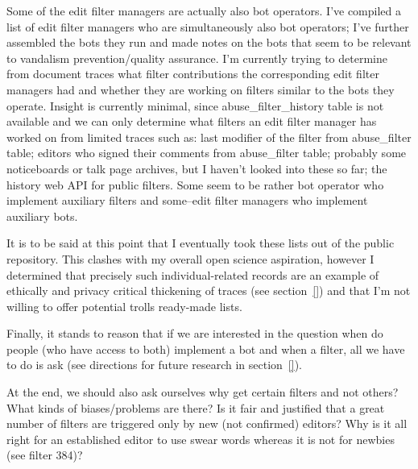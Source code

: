 Some of the edit filter managers are actually also bot operators.
I've compiled a list of edit filter managers who are simultaneously also bot operators;
I've further assembled the bots they run and made notes on the bots that seem to be relevant to vandalism prevention/quality assurance.
I'm currently trying to determine from document traces what filter contributions the corresponding edit filter managers had and whether they are working on filters similar to the bots they operate.
Insight is currently minimal, since abuse\_filter\_history table is not available and we can only determine what filters an edit filter manager has worked on from limited traces such as: last modifier of the filter from abuse\_filter table; editors who signed their comments from abuse\_filter table; probably some noticeboards or talk page archives, but I haven't looked into these so far; the history web API for public filters.
Some seem to be rather bot operator who implement auxiliary filters and some–edit filter managers who implement auxiliary bots.

It is to be said at this point that I eventually took these lists out of the public repository.
This clashes with my overall open science aspiration, however I determined that precisely such individual-related records are an example of ethically and privacy critical thickening of traces (see section~\ref{})
and that I'm not willing to offer potential trolls ready-made lists.

Finally, it stands to reason that if we are interested in the question when do people (who have access to both) implement a bot and when a filter, all we have to do is ask (see directions for future research in section~\ref{}).

At the end, we should also ask ourselves why get certain filters and not others? What kinds of biases/problems are there?
Is it fair and justified that a great number of filters are triggered only by new (not confirmed) editors?
Why is it all right for an established editor to use swear words whereas it is not for newbies (see filter 384)?


\begin{comment}
## Open questions

If discerning motivation is difficult, and, we want to achieve different results, depending on the motivation, that lead us to the question whether filtering is the proper mechanism to deal with disruptive edits.

\end{comment}


